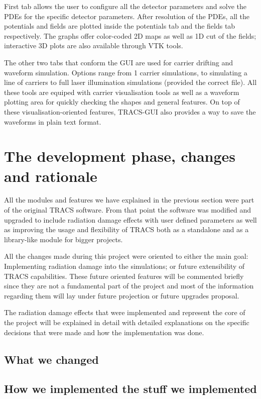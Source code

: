 First tab allows the user to configure all the detector parameters and solve the PDEs for the specific detector parameters. After resolution of the PDEs, all the potentials and fields are plotted inside the potentials tab and the fields tab respectively. The graphs offer color-coded 2D maps as well as 1D cut of the fields; interactive 3D plots are also available through VTK tools.

The other two tabs that conform the GUI are used for carrier drifting and waveform simulation. Options range from 1 carrier simulations, to simulating a line of carriers to full laser illumination simulations (provided the correct file). All these tools are equiped with carrier visualisation tools as well as a waveform plotting area for quickly checking the shapes and general features. On top of these visualisation-oriented features, TRACS-GUI also provides a way to save the waveforms in plain text format.

\section{The development phase, changes and rationale} %
\label{sec:werk}

All the modules and features we have explained in the previous section were part of the original TRACS software. From that point the software was modified and upgraded to include radiation damage effects  with user defined parameters as well as improving the usage and flexibility of TRACS both as a standalone and as a library-like module for bigger projects.

All the changes made during this project were oriented to either the main goal: Implementing radiation damage into the simulations; or future extensibility of TRACS capabilities. These future oriented features will be commented briefly since they are not a fundamental part of the project and most of the information regarding them will lay under future projection or future upgrades proposal.

The radiation damage effects that were implemented and represent the core of the project will be explained in detail with detailed explanations on the specific decisions that were made and how the implementation was done. 

\subsection{What we changed}
\subsection{How we implemented the stuff we implemented}

